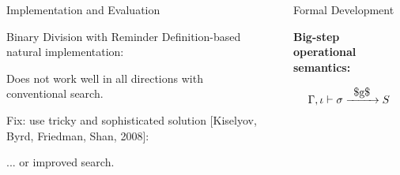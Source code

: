 \documentclass[final,20pt]{beamer}
\newcommand{\ocanren}[1]{\mbox{\lstinline|#1|}}
\newcommand{\Xrightarrow}[1]{\xrightarrow{\phantom{x}#1\phantom{x}}}
\begin{document}
\begin{frame}[t]
\begin{columns}[t]
\begin{column}{\onecolwid}
\begin{block}{Implementation and Evaluation}
      \bigskip
      

      \begin{exampleblock}{Binary Division with Reminder}
        \justifying
        Definition-based natural implementation:


 
        \bigskip
        
        \bigskip

        Does not work well in all directions with conventional search.

        \bigskip

        Fix: use tricky and sophisticated solution [Kiselyov, Byrd, Friedman, Shan, 2008]:
 
        

        ... or improved search.        
      \end{exampleblock}
    \end{block}

  \end{column}

  \begin{column}{\sepwid}\end{column} %

  \begin{column}{\onecolwid} %
  
    \begin{block}{Formal Development}
      \vskip5mm      
      \begin{center} 
         \textbf{Big-step operational semantics:}

	 $$\Gamma, \iota \vdash \sigma \Xrightarrow{\ocanren{$g$}} S$$


\end{center}
\end{block}
\end{column}
\end{columns}
\end{frame}
\end{document}
